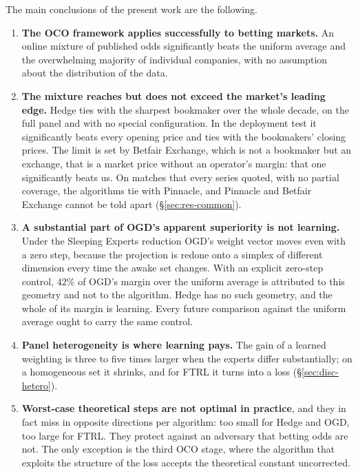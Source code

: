 \documentclass[12pt,a4paper,oneside]{report}
\renewcommand{\_}{\oldunderscore\allowbreak}
\theoremstyle{definition}
\theoremstyle{plain}
\theoremstyle{definition}   %
\begin{document}
The main conclusions of the present work are the following.

\begin{enumerate}
  \item \textbf{The OCO framework applies successfully to betting markets.} An online mixture of
        published odds significantly beats the uniform average and the overwhelming majority of
        individual companies, with no assumption about the distribution of the data.

  \item \textbf{The mixture reaches but does not exceed the market's leading edge.} Hedge ties with
        the sharpest bookmaker over the whole decade, on the full panel and with no special
        configuration. In the deployment test it significantly beats every opening
        price and ties with the bookmakers' closing prices. The limit is set by Betfair Exchange,
        which is not a bookmaker but an exchange, that is a market price without an operator's
        margin: that one significantly beats us. On matches that every series quoted, with no
        partial coverage, the algorithms tie with Pinnacle, and Pinnacle and Betfair Exchange
        cannot be told apart (\S\ref{sec:res-common}).

  \item \textbf{A substantial part of OGD's apparent superiority is not learning.} Under the
        Sleeping Experts reduction OGD's weight vector moves even with a zero step, because the
        projection is redone onto a simplex of different dimension every time the awake set
        changes. With an explicit zero-step control, $42\%$ of OGD's margin over the uniform
        average is attributed to this geometry and not to the algorithm. Hedge has no such
        geometry, and the whole of its margin is learning. Every future comparison against the
        uniform average ought to carry the same control.

  \item \textbf{Panel heterogeneity is where learning pays.} The gain of a learned weighting is
        three to five times larger when the experts differ substantially; on a homogeneous set it
        shrinks, and for FTRL it turns into a loss (\S\ref{sec:disc-hetero}).

  \item \textbf{Worst-case theoretical steps are not optimal in practice}, and they in fact miss in
        opposite directions per algorithm: too small for Hedge and OGD, too large for FTRL. They protect against an adversary that betting odds are
        not. The only exception is the third OCO stage, where the algorithm that exploits the
        structure of the loss accepts the theoretical constant uncorrected.


\end{enumerate}
\end{document}
